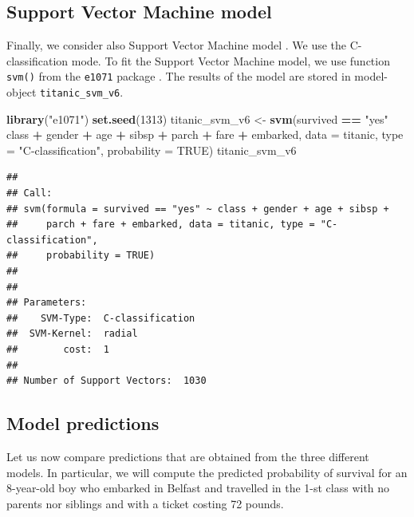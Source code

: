 \documentclass[]{krantz}
\newenvironment{Shaded}{\begin{snugshade}}{\end{snugshade}}
\newcommand{\DataTypeTok}[1]{\textcolor[rgb]{0.13,0.29,0.53}{#1}}
\newcommand{\DecValTok}[1]{\textcolor[rgb]{0.00,0.00,0.81}{#1}}
\newcommand{\KeywordTok}[1]{\textcolor[rgb]{0.13,0.29,0.53}{\textbf{#1}}}
\newcommand{\NormalTok}[1]{#1}
\newcommand{\OperatorTok}[1]{\textcolor[rgb]{0.81,0.36,0.00}{\textbf{#1}}}
\newcommand{\OtherTok}[1]{\textcolor[rgb]{0.56,0.35,0.01}{#1}}
\newcommand{\StringTok}[1]{\textcolor[rgb]{0.31,0.60,0.02}{#1}}
\begin{document}
\hypertarget{model-titanic-svm}{%
\subsection{Support Vector Machine model}\label{model-titanic-svm}}

Finally, we consider also Support Vector Machine model \citep{svm95vapnik}. We use the C-classification mode. To fit the Support Vector Machine model, we use function \texttt{svm()} from the \texttt{e1071} package \citep{e1071}. The results of the model are stored in model-object \texttt{titanic\_svm\_v6}.

\begin{Shaded}
\begin{Highlighting}[]
\KeywordTok{library}\NormalTok{(}\StringTok{"e1071"}\NormalTok{)}
\KeywordTok{set.seed}\NormalTok{(}\DecValTok{1313}\NormalTok{)}
\NormalTok{titanic_svm_v6 <-}\StringTok{ }\KeywordTok{svm}\NormalTok{(survived }\OperatorTok{==}\StringTok{ "yes"} \OperatorTok{~}\StringTok{ }\NormalTok{class }\OperatorTok{+}\StringTok{ }\NormalTok{gender }\OperatorTok{+}\StringTok{ }\NormalTok{age }\OperatorTok{+}\StringTok{ }\NormalTok{sibsp }\OperatorTok{+}
\StringTok{            }\NormalTok{parch }\OperatorTok{+}\StringTok{ }\NormalTok{fare }\OperatorTok{+}\StringTok{ }\NormalTok{embarked, }\DataTypeTok{data =}\NormalTok{ titanic, }
            \DataTypeTok{type =} \StringTok{"C-classification"}\NormalTok{, }\DataTypeTok{probability =} \OtherTok{TRUE}\NormalTok{)}
\NormalTok{titanic_svm_v6}
\end{Highlighting}
\end{Shaded}

\begin{verbatim}
## 
## Call:
## svm(formula = survived == "yes" ~ class + gender + age + sibsp + 
##     parch + fare + embarked, data = titanic, type = "C-classification", 
##     probability = TRUE)
## 
## 
## Parameters:
##    SVM-Type:  C-classification 
##  SVM-Kernel:  radial 
##        cost:  1 
## 
## Number of Support Vectors:  1030
\end{verbatim}

\hypertarget{predictions-titanic}{%
\subsection{Model predictions}\label{predictions-titanic}}

Let us now compare predictions that are obtained from the three different models. In particular, we will compute the predicted probability of survival for an 8-year-old boy who embarked in Belfast and travelled in the 1-st class with no parents nor siblings and with a ticket costing 72 pounds.
\end{document}
